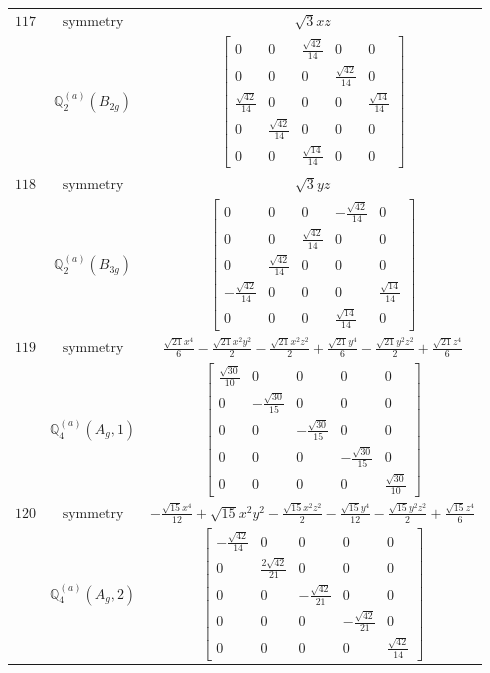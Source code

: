 \documentclass[fleqn,8pt,landscape]{jsarticle}
\begin{document}
\begin{longtable}{ccc}
$ 117 $ & $ \text{symmetry} $ & $ \sqrt{3} x z $ \\
$  $ & $ \mathbb{Q}_{2}^{(a)}(B_{2g}) $ & $ \begin{bmatrix} 0 & 0 & \frac{\sqrt{42}}{14} & 0 & 0 \\ 0 & 0 & 0 & \frac{\sqrt{42}}{14} & 0 \\ \frac{\sqrt{42}}{14} & 0 & 0 & 0 & \frac{\sqrt{14}}{14} \\ 0 & \frac{\sqrt{42}}{14} & 0 & 0 & 0 \\ 0 & 0 & \frac{\sqrt{14}}{14} & 0 & 0 \end{bmatrix} $ \\ \hline
$ 118 $ & $ \text{symmetry} $ & $ \sqrt{3} y z $ \\
$  $ & $ \mathbb{Q}_{2}^{(a)}(B_{3g}) $ & $ \begin{bmatrix} 0 & 0 & 0 & - \frac{\sqrt{42}}{14} & 0 \\ 0 & 0 & \frac{\sqrt{42}}{14} & 0 & 0 \\ 0 & \frac{\sqrt{42}}{14} & 0 & 0 & 0 \\ - \frac{\sqrt{42}}{14} & 0 & 0 & 0 & \frac{\sqrt{14}}{14} \\ 0 & 0 & 0 & \frac{\sqrt{14}}{14} & 0 \end{bmatrix} $ \\ \hline
$ 119 $ & $ \text{symmetry} $ & $ \frac{\sqrt{21} x^{4}}{6} - \frac{\sqrt{21} x^{2} y^{2}}{2} - \frac{\sqrt{21} x^{2} z^{2}}{2} + \frac{\sqrt{21} y^{4}}{6} - \frac{\sqrt{21} y^{2} z^{2}}{2} + \frac{\sqrt{21} z^{4}}{6} $ \\
$  $ & $ \mathbb{Q}_{4}^{(a)}(A_{g},1) $ & $ \begin{bmatrix} \frac{\sqrt{30}}{10} & 0 & 0 & 0 & 0 \\ 0 & - \frac{\sqrt{30}}{15} & 0 & 0 & 0 \\ 0 & 0 & - \frac{\sqrt{30}}{15} & 0 & 0 \\ 0 & 0 & 0 & - \frac{\sqrt{30}}{15} & 0 \\ 0 & 0 & 0 & 0 & \frac{\sqrt{30}}{10} \end{bmatrix} $ \\ \hline
$ 120 $ & $ \text{symmetry} $ & $ - \frac{\sqrt{15} x^{4}}{12} + \sqrt{15} x^{2} y^{2} - \frac{\sqrt{15} x^{2} z^{2}}{2} - \frac{\sqrt{15} y^{4}}{12} - \frac{\sqrt{15} y^{2} z^{2}}{2} + \frac{\sqrt{15} z^{4}}{6} $ \\
$  $ & $ \mathbb{Q}_{4}^{(a)}(A_{g},2) $ & $ \begin{bmatrix} - \frac{\sqrt{42}}{14} & 0 & 0 & 0 & 0 \\ 0 & \frac{2 \sqrt{42}}{21} & 0 & 0 & 0 \\ 0 & 0 & - \frac{\sqrt{42}}{21} & 0 & 0 \\ 0 & 0 & 0 & - \frac{\sqrt{42}}{21} & 0 \\ 0 & 0 & 0 & 0 & \frac{\sqrt{42}}{14} \end{bmatrix} $ \\ \hline

\end{longtable}
\end{document}
